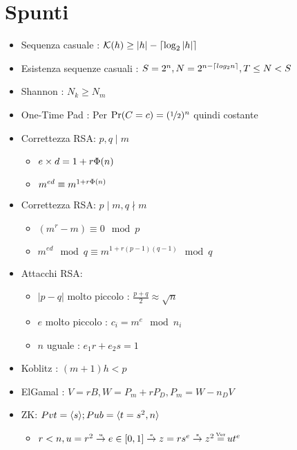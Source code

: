 \chapter{Spunti}

\begin{itemize}
    \item Sequenza casuale : $\mathcal{K}(h) \geq |h| - {\lceil \log_2|h| \rceil}$
    \item Esistenza sequenze casuali : $S = 2^n, N = 2^{n - {\lceil log_2n \rceil}}, T \leq N < S$
    \item Shannon : $N_k \geq N_m$
    \item One-Time Pad : Per  $\Pr(C = c) = (\nicefrac{1}{2})^n$ quindi costante
    \item Correttezza RSA: $p, q \mid m$
    \begin{itemize}
        \item $e \times d = 1 + r{\Phi(n)}$
        \item $m^{ed} \equiv m^{1+r{\Phi(n)}}$
    \end{itemize}
    \item Correttezza RSA: $p \mid m, q \nmid m$
    \begin{itemize}
        \item $(m^r - m) \equiv 0 \mod{p}$
        \item $m^{ed} \mod{q} \equiv m^{1+r(p-1)(q-1)} \mod{q}$
    \end{itemize}
    \item Attacchi RSA:
    \begin{itemize}
        \item $|p-q|$ molto piccolo : $\frac{p+q}{2} \approx \sqrt{n}$
        \item $e$ molto piccolo : $c_i = m^e \mod{n_i}$
        \item $n$ uguale : $e_1r + e_2s = 1$
    \end{itemize}
    \item Koblitz : $(m+1)h<p$
    \item ElGamal : $V = rB, W = P_m + rP_D, P_m = W - n_DV$
    \item ZK: $Pvt = {\langle s \rangle}; Pub = {\langle t = s^2, n \rangle}$
    \begin{itemize}
        \item $r < n, u = r^2 \dto{u} e \in [0,1] \dto{e} z = rs^e \dto{z} z^2 \de{Ver} ut^e$
    \end{itemize}
\end{itemize}